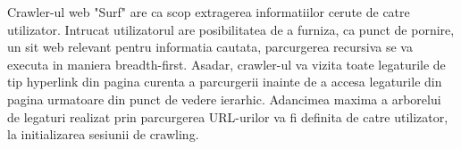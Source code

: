 Crawler-ul web "Surf" are ca scop extragerea informatiilor cerute de catre utilizator. Intrucat utilizatorul are posibilitatea de a furniza, ca punct de pornire, un sit web relevant pentru informatia cautata, parcurgerea recursiva se va executa in maniera breadth-first. Asadar, crawler-ul va vizita toate legaturile de tip hyperlink din pagina curenta a parcurgerii inainte de a accesa legaturile din pagina urmatoare din punct de vedere ierarhic. Adancimea maxima a arborelui de legaturi realizat prin parcurgerea URL-urilor va fi definita de catre utilizator, la initializarea sesiunii de crawling.